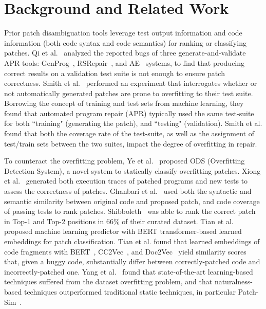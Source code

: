\documentclass[12pt,openany,oneside,table]{cmuthesis}
\begin{document}
\section{Background and Related Work}

Prior patch disambiguation tools leverage test output information and code information (both code syntax and code semantics) for ranking or classifying patches. Qi et al.~\cite{qi2015analysis} analyzed the reported bugs of three generate-and-validate APR tools: GenProg~\cite{genprog}, RSRepair~\cite{rsrepair}, and AE~\cite{ae} systems, to find that producing correct results on a validation test suite is not enough to ensure patch correctness. Smith et al.~\cite{CURE} performed an experiment that interrogates whether or not automatically generated patches are prone to overfitting to their test suite. Borrowing the concept of training and test sets from machine learning, they found that automated program repair (APR) typically used the same test-suite for both ``training" (generating the patch), and ``testing" (validation). Smith et al. found that both the coverage rate of the test-suite, as well as the assignment of test/train sets between the two suites, impact the degree of overfitting in repair.

To counteract the overfitting problem, Ye et al.~\cite{ye_patches} proposed ODS (Overfitting Detection System), a novel system to statically classify overfitting patches. Xiong et al.~\cite{patch-sim} generated both execution traces of patched programs and new tests to assess the correctness of patches. Ghanbari et al.~\cite{Shibboleth} used both the syntactic and semantic similarity between original code and proposed patch, and code coverage of passing tests to rank patches. Shibboleth~\cite{Shibboleth} was able to rank the correct patch in Top-1 and Top-2 positions in 66\% of their curated dataset. Tian et al.~\cite{Panther} proposed machine learning predictor with BERT transformer-based learned embeddings for patch classification. Tian et al. found that learned embeddings of code fragments with BERT~\cite{BERT}, CC2Vec~\cite{cc2vec}, and Doc2Vec~\cite{doc2vec} yield similarity scores that, given a buggy code, substantially differ between correctly-patched code and incorrectly-patched one. Yang et al.~\cite{yang2023large} found that state-of-the-art learning-based techniques suffered from the dataset overfitting problem, and that naturalness-based techniques outperformed traditional static techniques, in particular Patch-Sim~\cite{patch-sim}.
\end{document}
